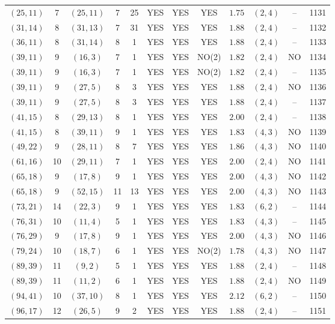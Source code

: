 \begin{longtable}{|c|c|c|c|c|c|c|c|c|c|c|c|}
$(25,11)$ & 7 & $(25,11)$ & 7 & 25 & YES & YES & YES & $1.75$ & $(2,4)$ & -- & 1131\\
$(31,14)$ & 8 & $(31,13)$ & 7 & 31 & YES & YES & YES & $1.88$ & $(2,4)$ & -- & 1132\\
$(36,11)$ & 8 & $(31,14)$ & 8 & 1 & YES & YES & YES & $1.88$ & $(2,4)$ & -- & 1133\\
$(39,11)$ & 9 & $(16,3)$ & 7 & 1 & YES & YES & NO(2) & $1.82$ & $(2,4)$ & NO & 1134\\
$(39,11)$ & 9 & $(16,3)$ & 7 & 1 & YES & YES & NO(2) & $1.82$ & $(2,4)$ & -- & 1135\\
$(39,11)$ & 9 & $(27,5)$ & 8 & 3 & YES & YES & YES & $1.88$ & $(2,4)$ & NO & 1136\\
$(39,11)$ & 9 & $(27,5)$ & 8 & 3 & YES & YES & YES & $1.88$ & $(2,4)$ & -- & 1137\\
$(41,15)$ & 8 & $(29,13)$ & 8 & 1 & YES & YES & YES & $2.00$ & $(2,4)$ & -- & 1138\\
$(41,15)$ & 8 & $(39,11)$ & 9 & 1 & YES & YES & YES & $1.83$ & $(4,3)$ & NO & 1139\\
$(49,22)$ & 9 & $(28,11)$ & 8 & 7 & YES & YES & YES & $1.86$ & $(4,3)$ & NO & 1140\\
$(61,16)$ & 10 & $(29,11)$ & 7 & 1 & YES & YES & YES & $2.00$ & $(2,4)$ & NO & 1141\\
$(65,18)$ & 9 & $(17,8)$ & 9 & 1 & YES & YES & YES & $2.00$ & $(4,3)$ & NO & 1142\\
$(65,18)$ & 9 & $(52,15)$ & 11 & 13 & YES & YES & YES & $2.00$ & $(4,3)$ & NO & 1143\\
$(73,21)$ & 14 & $(22,3)$ & 9 & 1 & YES & YES & YES & $1.83$ & $(6,2)$ & -- & 1144\\
$(76,31)$ & 10 & $(11,4)$ & 5 & 1 & YES & YES & YES & $1.83$ & $(4,3)$ & -- & 1145\\
$(76,29)$ & 9 & $(17,8)$ & 9 & 1 & YES & YES & YES & $2.00$ & $(4,3)$ & NO & 1146\\
$(79,24)$ & 10 & $(18,7)$ & 6 & 1 & YES & YES & NO(2) & $1.78$ & $(4,3)$ & NO & 1147\\
$(89,39)$ & 11 & $(9,2)$ & 5 & 1 & YES & YES & YES & $1.88$ & $(2,4)$ & -- & 1148\\
$(89,39)$ & 11 & $(11,2)$ & 6 & 1 & YES & YES & YES & $1.88$ & $(2,4)$ & NO & 1149\\
$(94,41)$ & 10 & $(37,10)$ & 8 & 1 & YES & YES & YES & $2.12$ & $(6,2)$ & -- & 1150\\
$(96,17)$ & 12 & $(26,5)$ & 9 & 2 & YES & YES & YES & $1.88$ & $(2,4)$ & -- & 1151\\

\end{longtable}
